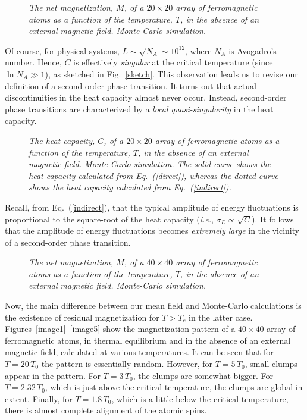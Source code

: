 \begin{figure}
\epsfysize=3in
\centerline{}
\caption{\em The net magnetization, $M$, of a $20\times 20$ array of ferromagnetic atoms as a
function of the temperature, $T$, in the absence of an external magnetic
field. Monte-Carlo simulation.}
\end{figure}

Of course, for physical systems, $L\sim \sqrt{N_A} \sim 10^{12}$, where $N_A$ is Avogadro's
number. Hence, $C$ is effectively {\em singular} at the critical temperature
(since $\ln N_A \gg 1$), as sketched in 
Fig.~\ref{sketch}. This observation leads us to revise our definition of a second-order phase
transition. It turns out that actual discontinuities in the heat capacity almost
never occur. Instead, second-order phase transitions are
characterized by a {\em local quasi-singularity} in the heat capacity.

\begin{figure}
\epsfysize=3in
\centerline{}
\caption{\em The heat capacity, $C$, of a  $20\times 20$ array of ferromagnetic atoms as a
function of the temperature, $T$, in the absence of an external magnetic
field. Monte-Carlo simulation. The solid curve shows the heat capacity calculated
from Eq.~(\ref{direct}), whereas  the dotted curve shows the heat capacity calculated
from Eq.~(\ref{indirect}).}\label{ff9}
\end{figure}

Recall, from Eq.~(\ref{indirect}), that the typical amplitude of energy fluctuations is proportional
to the square-root of the heat capacity ({\em i.e.}, $\sigma_E\propto \sqrt{C}$). It
follows that the amplitude of energy fluctuations becomes {\em extremely large} in the vicinity
of a second-order phase transition.

\begin{figure}
\epsfysize=3in
\centerline{}
\caption{\em  The net magnetization, $M$, of a  $40\times 40$ array of ferromagnetic atoms as a
function of the temperature, $T$, in the absence of an external magnetic
field. Monte-Carlo simulation.}
\end{figure}

Now, the main difference between our mean field and Monte-Carlo calculations is the existence
of residual magnetization for $T>T_c$ in the latter case. Figures~\ref{image1}--\ref{image5} 
show the magnetization pattern of  a $40\times 40$ array of ferromagnetic atoms, in thermal
equilibrium and in the absence of an external magnetic field, calculated at various temperatures.
It can be seen that for $T=20\,T_0$ the pattern is essentially random. However,
for $T=5\,T_0$, small clumps appear in the pattern. For $T=3\,T_0$, the clumps
are somewhat bigger. For $T=2.32\,T_0$, which is just above the critical temperature,
the clumps are global in extent. Finally, for $T=1.8\,T_0$, which is a little
below the critical temperature, there is almost complete alignment of the atomic spins.

